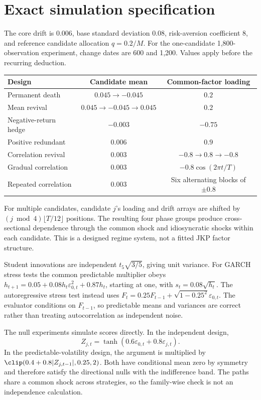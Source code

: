 \section{Exact simulation specification}\label{app:dgp}
The core drift is 0.006, base standard deviation 0.08, risk-aversion coefficient 8, and reference candidate allocation $q=0.2/M$. For the one-candidate 1,800-observation experiment, change dates are 600 and 1,200. Values apply before the recurring deduction.
\begin{center}\small
\begin{tabular}{lcc}
\toprule Design & Candidate mean & Common-factor loading \\\midrule
Permanent death & $0.045\to-0.045$ & $0.2$ \\
Mean revival & $0.045\to-0.045\to0.045$ & $0.2$ \\
Negative-return hedge & $-0.003$ & $-0.75$ \\
Positive redundant & $0.006$ & $0.9$ \\
Correlation revival & $0.003$ & $-0.8\to0.8\to-0.8$ \\
Gradual correlation & $0.003$ & $-0.8\cos(2\pi t/T)$ \\
Repeated correlation & $0.003$ & Six alternating blocks of $\pm0.8$ \\\bottomrule
\end{tabular}
\end{center}
For multiple candidates, candidate $j$'s loading and drift arrays are shifted by $(j\bmod4)\lfloor T/12\rfloor$ positions. The resulting four phase groups produce cross-sectional dependence through the common shock and idiosyncratic shocks within each candidate. This is a designed regime system, not a fitted JKP factor structure.

Student innovations are independent $t_5\sqrt{3/5}$, giving unit variance. For GARCH stress tests the common predictable multiplier obeys
$h_{t+1}=0.05+0.08h_t\varepsilon_{0,t}^2+0.87h_t$, starting at one, with $s_t=0.08\sqrt{h_t}$. The autoregressive stress test instead uses
$F_t=0.25F_{t-1}+\sqrt{1-0.25^2}\varepsilon_{0,t}$.
The evaluator conditions on $F_{t-1}$, so predictable means and variances are correct rather than treating autocorrelation as independent noise.

The null experiments simulate scores directly. In the independent design,
\[Z_{j,t}=\tanh(0.6\varepsilon_{0,t}+0.8\varepsilon_{j,t}).\]
In the predictable-volatility design, the argument is multiplied by
$\clip(0.4+0.8|Z_{j,t-1}|,0.25,2)$.
Both have conditional mean zero by symmetry and therefore satisfy the directional nulls with the indifference band. The paths share a common shock across strategies, so the family-wise check is not an independence calculation.

